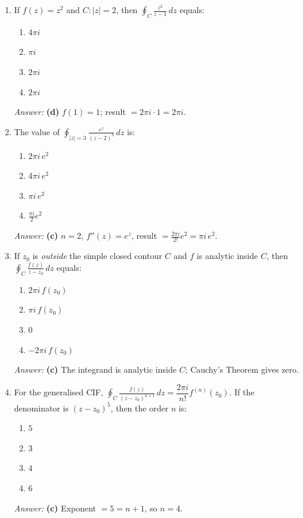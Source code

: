 \documentclass[12pt,a4paper]{article}
\begin{document}
\begin{enumerate}[label=\textbf{MCQ \arabic*.}, leftmargin=*]

  \item If $f(z) = z^2$ and $C: |z| = 2$, then $\displaystyle\oint_C \frac{z^2}{z-1}\,dz$ equals:
  \begin{enumerate}[label=(\alph*)]
    \item $4\pi i$
    \item $\pi i$
    \item $2\pi i$
    \item \textbf{$2\pi i$}
  \end{enumerate}
  \textit{Answer:} \textbf{(d)} $f(1) = 1$; result $= 2\pi i \cdot 1 = 2\pi i$.

  \item The value of $\displaystyle\oint_{|z|=3}\frac{e^z}{(z-2)^3}\,dz$ is:
  \begin{enumerate}[label=(\alph*)]
    \item $2\pi i\,e^2$
    \item $4\pi i\,e^2$
    \item \textbf{$\pi i\,e^2$}
    \item $\frac{\pi i}{2}e^2$
  \end{enumerate}
  \textit{Answer:} \textbf{(c)} $n=2$, $f''(z)=e^z$, result $= \frac{2\pi i}{2!}e^2 = \pi i\,e^2$.

  \item If $z_0$ is \emph{outside} the simple closed contour $C$ and $f$ is analytic
  inside $C$, then $\displaystyle\oint_C\frac{f(z)}{z-z_0}\,dz$ equals:
  \begin{enumerate}[label=(\alph*)]
    \item $2\pi i\,f(z_0)$
    \item $\pi i\,f(z_0)$
    \item \textbf{$0$}
    \item $-2\pi i\,f(z_0)$
  \end{enumerate}
  \textit{Answer:} \textbf{(c)} The integrand is analytic inside $C$; Cauchy's Theorem gives zero.

  \item For the generalised CIF, $\displaystyle\oint_C\frac{f(z)}{(z-z_0)^{n+1}}\,dz = \dfrac{2\pi i}{n!}f^{(n)}(z_0)$.
  If the denominator is $(z - z_0)^5$, then the order $n$ is:
  \begin{enumerate}[label=(\alph*)]
    \item $5$
    \item $3$
    \item \textbf{$4$}
    \item $6$
  \end{enumerate}
  \textit{Answer:} \textbf{(c)} Exponent $= 5 = n+1$, so $n = 4$.


\end{enumerate}
\end{document}
